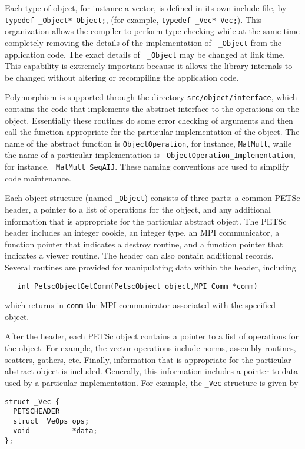 Each type of object, for instance a vector, is defined in its own
include file, by {\tt typedef \_Object* Object;}, (for example, 
{\tt typedef \_Vec* Vec;}).  This organization
allows the compiler to perform type checking while at the same time
completely removing the details of the implementation of {\tt
\_Object} from the application code. The exact details of {\tt
\_Object} may be changed at link time. This capability is extremely important
because it allows the library internals to be changed
without altering or recompiling the application code.

Polymorphism is supported through the directory {\tt src/object/interface},
which contains the code that implements the abstract interface to the
operations on the object.  Essentially these routines do some error
checking of arguments and then call the function appropriate for the
particular implementation of the object. The name of the abstract
function is {\tt ObjectOperation}, for instance, {\tt MatMult}, while
the name of a particular implementation is {\tt
ObjectOperation\_Implementation}, for instance, {\tt
MatMult\_SeqAIJ}. These naming conventions are used to simplify code
maintenance.

Each object structure (named {\tt \_Object}) consists of three parts:
a common PETSc header, a pointer to a list of operations for the
object, and any additional information that is appropriate for the
particular abstract object.  The PETSc header includes an integer
cookie, an integer type, an MPI communicator, a function pointer that
indicates a destroy routine, and a function pointer that indicates a
viewer routine. The header can also contain additional records.
Several routines are provided for manipulating data within the header,
including
\begin{verbatim}
   int PetscObjectGetComm(PetscObject object,MPI_Comm *comm) 
\end{verbatim}
which returns in {\tt comm} 
 the MPI communicator associated with the
specified object.

After the header, each PETSc object contains a pointer to a list of
operations for the object.  For example, the vector operations include
norms, assembly routines, scatters, gathers, etc.  Finally,
information that is appropriate for the particular abstract object is
included. Generally, this information includes a pointer to data used
by a particular implementation.  For example, the {\tt \_Vec}
structure is given by
\begin{verbatim}
struct _Vec {
  PETSCHEADER
  struct _VeOps ops;
  void          *data;
};
\end{verbatim}

